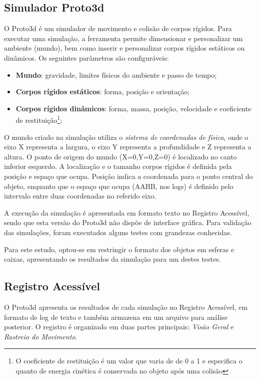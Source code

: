 \documentclass[12pt]{article}
\begin{document}
\subsection{Simulador Proto3d}
O Proto3d é um simulador de movimento e colisão de corpos rígidos. Para executar uma simulação, a ferramenta permite dimensionar e personalizar um ambiente (mundo), bem como inserir e personalizar corpos rígidos estáticos ou dinâmicos. Os seguintes parâmetros são configuráveis:
\begin{itemize}
	\item \textbf{Mundo}: gravidade, limites físicos do ambiente e passo de tempo;
	\item \textbf{Corpos rígidos estáticos}: forma, posição e orientação;
	\item \textbf{Corpos rígidos dinâmicos}: forma, massa, posição, velocidade e coeficiente de restituição\footnote{O coeficiente de restituição é um valor que varia de de 0 a 1 e especifica o quanto de energia cinética é conservada no objeto após uma colisão};
\end{itemize}

O mundo criado na simulação utiliza o \emph{sistema de coordenadas de física}, onde o eixo X representa a largura, o eixo Y representa a profundidade e Z representa a altura. O ponto de origem do mundo (X=0,Y=0,Z=0) é localizado no canto inferior esquerdo. A localização e o tamanho corpos rígidos é definida pela posição e espaço que ocupa. Posição indica a coordenada para o ponto central do objeto, enquanto que o espaço que ocupa (AABB, nos logs) é definido pelo intervalo entre duas coordenadas no referido eixo.


A execução da simulação é apresentada em formato texto no Registro Acessível, sendo que esta versão do Proto3d não dispõe de interface gráfica. Para validação das simulações, foram executados alguns testes com grandezas conhecidas. 

Para este estudo, optou-se em restringir o formato dos objetos em esferas e caixas, apresentando os resultados da simulação para um destes testes.

\subsection{Registro Acessível}
O Proto3d apresenta os resultados de cada simulação no Registro Acessível, em formato de log de texto e também armazena em um arquivo para análise posterior. O registro é organizado em duas partes principais: \emph{Visão Geral} e \emph{Rastreio do Movimento}.
\end{document}
